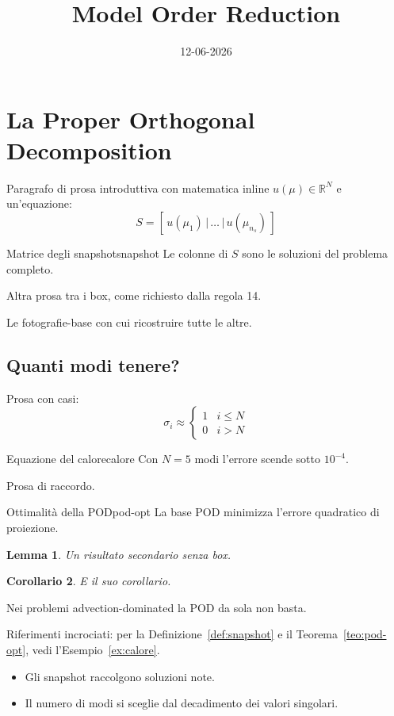 \documentclass[11pt,a4paper]{article}
\title{Model Order Reduction}
\date{12-06-2026}
\author{}
\theoremstyle{plain}
\newtheorem{lemma}{Lemma}[section]
\newtheorem{corollario}[lemma]{Corollario}
\begin{document}
\maketitle
\section{La Proper Orthogonal Decomposition}
Paragrafo di prosa introduttiva con matematica inline $u(\mu)\in\mathbb{R}^N$ e un'equazione:
\begin{equation}
S = [\,u(\mu_1)\,|\,\dots\,|\,u(\mu_{n_s})\,]
\end{equation}
\begin{definizione}{Matrice degli snapshot}{snapshot}
Le colonne di $S$ sono le soluzioni del problema completo.
\end{definizione}
Altra prosa tra i box, come richiesto dalla regola 14.
\begin{intuizione}
Le fotografie-base con cui ricostruire tutte le altre.
\end{intuizione}
\subsection{Quanti modi tenere?}
Prosa con casi:
\[ \sigma_i \approx \begin{cases} 1 & i \le N \\ 0 & i > N \end{cases} \]
\begin{esempio}{Equazione del calore}{calore}
Con $N=5$ modi l'errore scende sotto $10^{-4}$.
\end{esempio}
Prosa di raccordo.
\begin{teorema}{Ottimalit\`a della POD}{pod-opt}
La base POD minimizza l'errore quadratico di proiezione.
\end{teorema}
\begin{lemma}
Un risultato secondario senza box.
\end{lemma}
\begin{corollario}
E il suo corollario.
\end{corollario}
\begin{attenzione}
Nei problemi advection-dominated la POD da sola non basta.
\end{attenzione}
Riferimenti incrociati: per la Definizione~\ref{def:snapshot} e il Teorema~\ref{teo:pod-opt}, vedi l'Esempio~\ref{ex:calore}.
\begin{sintesi}
\begin{itemize}
\item Gli snapshot raccolgono soluzioni note.
\item Il numero di modi si sceglie dal decadimento dei valori singolari.
\end{itemize}
\end{sintesi}
\end{document}
